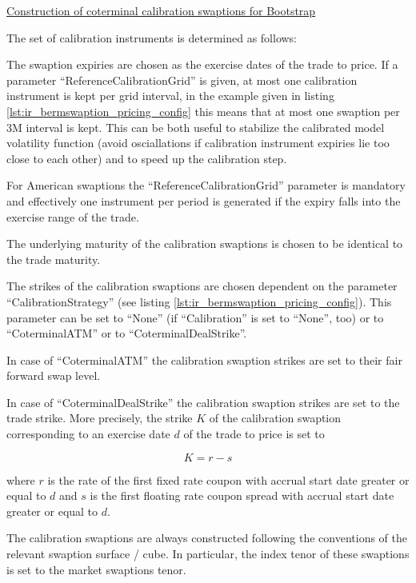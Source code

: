 \underline{Construction of coterminal calibration swaptions for Bootstrap}

The set of calibration instruments is determined as follows:

The swaption expiries are chosen as the exercise dates of the trade to price. If a parameter
``ReferenceCalibrationGrid'' is given, at most one calibration instrument is kept per grid interval, in the example
given in listing \ref{lst:ir_bermswaption_pricing_config} this means that at most one swaption per 3M interval is kept. This can
be both useful to stabilize the calibrated model volatility function (avoid osciallations if calibration instrument
expiries lie too close to each other) and to speed up the calibration step.

For American swaptions the ``ReferenceCalibrationGrid'' parameter is mandatory and effectively one instrument per period
is generated if the expiry falls into the exercise range of the trade.

The underlying maturity of the calibration swaptions is chosen to be identical to the trade maturity.

The strikes of the calibration swaptions are chosen dependent on the parameter ``CalibrationStrategy'' (see listing
\ref{lst:ir_bermswaption_pricing_config}). This parameter can be set to ``None'' (if ``Calibration'' is set to ``None'',
too) or to ``CoterminalATM'' or to ``CoterminalDealStrike''.

In case of ``CoterminalATM'' the calibration swaption strikes are set to their fair forward swap level.

In case of ``CoterminalDealStrike'' the calibration swaption strikes are set to the trade strike. More precisely, the
strike $K$ of the calibration swaption corresponding to an exercise date $d$ of the trade to price is set to

\begin{equation}
K = r - s
\end{equation}

where $r$ is the rate of the first fixed rate coupon with accrual start date greater or equal to $d$ and $s$ is the
first floating rate coupon spread with accrual start date greater or equal to $d$.

The calibration swaptions are always constructed following the conventions of the relevant swaption surface / cube. In
particular, the index tenor of these swaptions is set to the market swaptions tenor.



